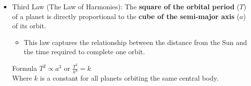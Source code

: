\documentclass[t,aspectratio=169]{beamer}
\begin{document}
\begin{frame}
\begin{itemize}
\pagebreak
\item Third Law (The Law of Harmonies): The \textbf{square of the orbital period} ($T$) of a planet is directly proportional to the \textbf{cube of the semi-major axis} ($a$) of its orbit.
    \begin{itemize}
        \item This law captures the relationship between the distance from the Sun and the time required to complete one orbit.
    \end{itemize}
    \begin{exampleblock}{Formula}
        $T^2 \propto a^3$ \quad or \quad $\frac{T^2}{a^3} = k$ \\
        Where $k$ is a constant for all planets orbiting the same central body.
      \end{exampleblock}

\end{itemize}
\end{frame}

\end{document}
